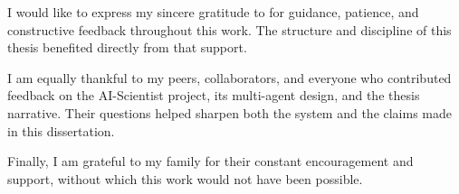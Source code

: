 
I would like to express my sincere gratitude to \textbf{\ThesisSupervisorName} for guidance, patience, and
constructive feedback throughout this work. The structure and discipline of this thesis benefited directly
from that support.

I am equally thankful to my peers, collaborators, and everyone who contributed feedback on the AI-Scientist
project, its multi-agent design, and the thesis narrative. Their questions helped sharpen both the system
and the claims made in this dissertation.

Finally, I am grateful to my family for their constant encouragement and support, without which this work would
not have been possible.

\vspace{2cm}
\begin{flushright}
\SignatureBlock[0.34\textwidth]{%
\textbf{\ThesisAuthorName}\\
\ThesisRollNumber\\
\ThesisProgram
}
\end{flushright}

\vfill
\noindent \ThesisApprovalDate\\
\ThesisPlace
\clearpage
